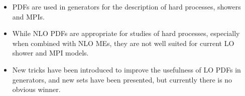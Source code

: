 \begin{itemize}
\item PDFs are used in generators for the description of hard processes,
showers and MPIs.
\item While NLO PDFs are appropriate for studies of hard processes,
especially when combined with NLO MEs, they are not well suited for
current LO shower and MPI models.
\item New tricks have been introduced to improve the usefulness of  
LO PDFs in generators, and new sets have been presented, but currently
there is no obvious winner.
\end{itemize}


